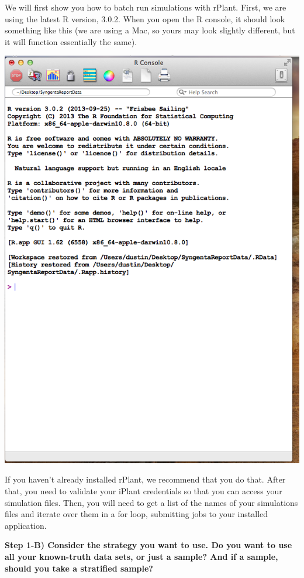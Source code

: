 \documentclass[twoside,a4paper]{refart}
\begin{document}
We will first show you how to batch run simulations with rPlant. First, we are using the latest R version, 3.0.2. When you open the R console, it should look something like this (we are using a Mac, so yours may look slightly different, but it will function essentially the same).
\begin{center}
	\includegraphics[width=\textwidth]{doc_step1_1}
\end{center}

If you haven't already installed rPlant, we recommend that you do that. After that, you need to validate your iPlant credentials so that you can access your simulation files. Then, you will need to get a list of the names of your simulations files and iterate over them in a for loop, submitting jobs to your installed application. 

\textbf{Step 1-B) Consider the strategy you want to use. Do you want to use all your known-truth data sets, or just a sample? And if a sample, should you take a stratified sample?}
\end{document}
